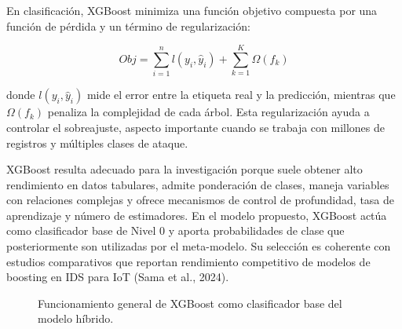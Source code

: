 \documentclass[12pt,a4paper]{article}
\begin{document}
En clasificación, XGBoost minimiza una función objetivo compuesta por una función de pérdida y un término de regularización:

\[
Obj = \sum_{i=1}^{n} l(y_i,\hat{y}_i) + \sum_{k=1}^{K} \Omega(f_k)
\]

donde $l(y_i,\hat{y}_i)$ mide el error entre la etiqueta real y la predicción, mientras que $\Omega(f_k)$ penaliza la complejidad de cada árbol. Esta regularización ayuda a controlar el sobreajuste, aspecto importante cuando se trabaja con millones de registros y múltiples clases de ataque.

XGBoost resulta adecuado para la investigación porque suele obtener alto rendimiento en datos tabulares, admite ponderación de clases, maneja variables con relaciones complejas y ofrece mecanismos de control de profundidad, tasa de aprendizaje y número de estimadores. En el modelo propuesto, XGBoost actúa como clasificador base de Nivel 0 y aporta probabilidades de clase que posteriormente son utilizadas por el meta-modelo. Su selección es coherente con estudios comparativos que reportan rendimiento competitivo de modelos de boosting en IDS para IoT (Sama et al., 2024).

\begin{figure}[H]
\centering
{}
\caption{Funcionamiento general de XGBoost como clasificador base del modelo híbrido.}
\end{figure}
\end{document}
